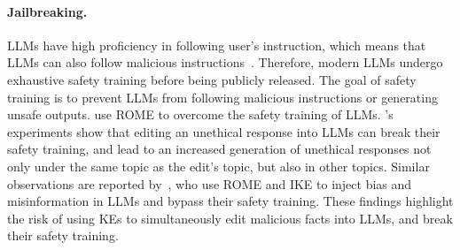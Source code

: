 \paragraph{Jailbreaking.} LLMs have high proficiency in following user's instruction, which means that LLMs can also follow malicious instructions~\cite{bianchi2024safetytuned}. Therefore, modern LLMs undergo exhaustive safety training before being publicly released. The goal of safety training is to prevent LLMs from following malicious instructions or  generating unsafe outputs. \citet{hazra-etal-2024-sowing} use ROME to overcome the safety training of LLMs. \citet{hazra-etal-2024-sowing}'s experiments show that editing an unethical response into LLMs can break their safety training, and lead to an increased generation of unethical responses not only under the same topic as the edit's topic, but also in other topics. Similar observations are reported by~\citet{chen-etal-2024-can}, who use ROME and IKE to inject bias and misinformation in LLMs and bypass their safety training. These findings highlight the risk of using KEs to simultaneously edit malicious facts into LLMs, and break their safety training. 



